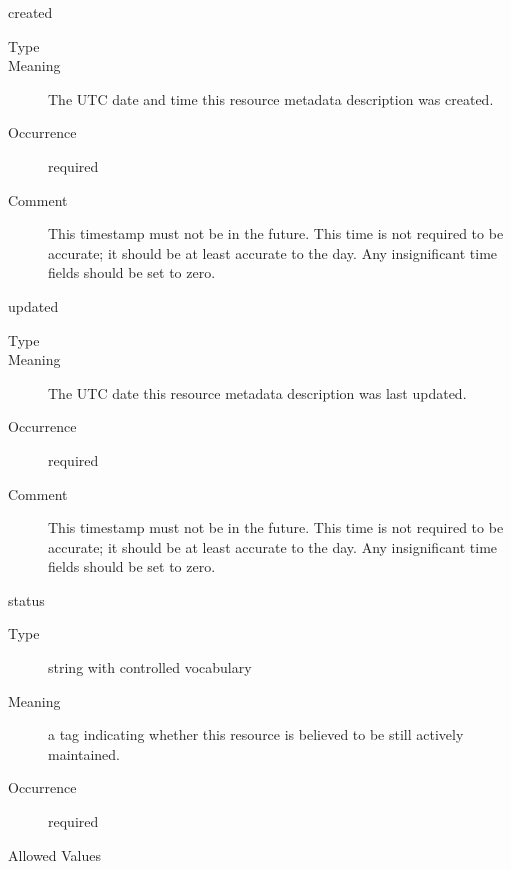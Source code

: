 \documentclass[11pt,a4paper]{ivoa}
\begin{document}
\begingroup\small\begin{bigdescription}
\item[created]
\begin{description}
\item[Type] 
\item[Meaning] 
              The UTC date and time this resource metadata description
              was created. 
            
\item[Occurrence] required
\item[Comment] 
              This timestamp must not be in the future.  This time is
              not required to be accurate; it should be at least
              accurate to the day.  Any insignificant time fields
              should be set to zero. 
            
\end{description}
\item[updated]
\begin{description}
\item[Type] 
\item[Meaning] 
              The UTC date this resource metadata description was last updated.
            
\item[Occurrence] required
\item[Comment] 
              This timestamp must not be in the future.  This time is
              not required to be accurate; it should be at least
              accurate to the day.  Any insignificant time fields
              should be set to zero. 
            
\end{description}
\item[status]
\begin{description}
\item[Type] string with controlled vocabulary
\item[Meaning] 
              a tag indicating whether this resource is believed to be still
              actively maintained.
            
\item[Occurrence] required

\item[Allowed Values]\hfil
{}
\end{description}


\end{bigdescription}\endgroup
\end{document}

